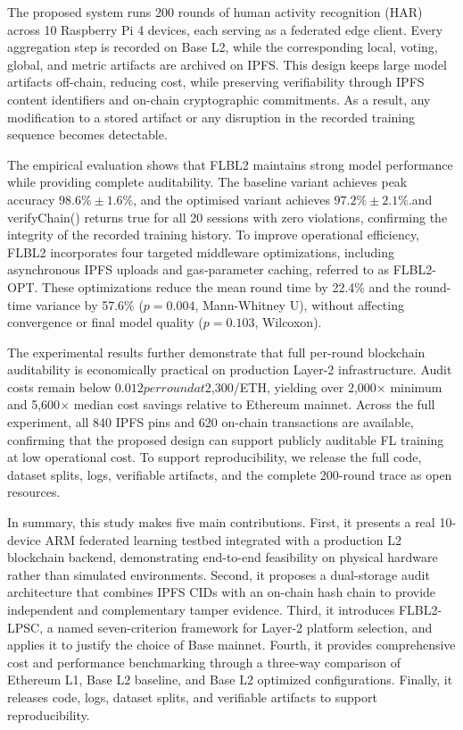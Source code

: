 \documentclass{llncs}
\begin{document}
The proposed system runs 200 rounds of human activity recognition (HAR) across 10 Raspberry Pi 4 devices, each serving as a federated edge client. Every aggregation step is recorded on Base L2, while the corresponding local, voting, global, and metric artifacts are archived on IPFS. This design keeps large model artifacts off-chain, reducing cost, while preserving verifiability through IPFS content identifiers and on-chain cryptographic commitments. As a result, any modification to a stored artifact or any disruption in the recorded training sequence becomes detectable.

The empirical evaluation shows that FLBL2 maintains strong model performance while providing complete auditability. The baseline variant achieves peak accuracy $98.6\% \pm 1.6\%$, and the optimised variant achieves $97.2\% \pm 2.1\%$.and verifyChain() returns true for all 20 sessions with zero violations, confirming the integrity of the recorded training history. To improve operational efficiency, FLBL2 incorporates four targeted middleware optimizations, including asynchronous IPFS uploads and gas-parameter caching, referred to as FLBL2-OPT. These optimizations reduce the mean round time by 22.4\% and the round-time variance by 57.6\% ($p=0.004$, Mann-Whitney U), without affecting convergence or final model quality ($p=0.103$, Wilcoxon).

The experimental results further demonstrate that full per-round blockchain auditability is economically practical on production Layer-2 infrastructure. Audit costs remain below $0.012 per round at $2,300/ETH, yielding over 2,000$\times$ minimum and 5,600$\times$ median cost savings relative to Ethereum mainnet. Across the full experiment, all 840 IPFS pins and 620 on-chain transactions are available, confirming that the proposed design can support publicly auditable FL training at low operational cost. To support reproducibility, we release the full code, dataset splits, logs, verifiable artifacts, and the complete 200-round trace as open resources.

In summary, this study makes five main contributions. First, it presents a real 10-device ARM federated learning testbed integrated with a production L2 blockchain backend, demonstrating end-to-end feasibility on physical hardware rather than simulated environments. Second, it proposes a dual-storage audit architecture that combines IPFS CIDs with an on-chain hash chain to provide independent and complementary tamper evidence. Third, it introduces FLBL2-LPSC, a named seven-criterion framework for Layer-2 platform selection, and applies it to justify the choice of Base mainnet. Fourth, it provides comprehensive cost and performance benchmarking through a three-way comparison of Ethereum L1, Base L2 baseline, and Base L2 optimized configurations. Finally, it releases code, logs, dataset splits, and verifiable artifacts to support reproducibility.
\end{document}
